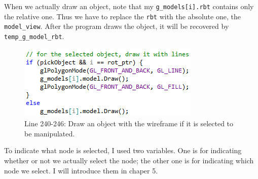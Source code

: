 \documentclass[11pt]{article}
\begin{document}
When we actually draw an object, note that my \texttt{g\_models[i].rbt} contains only the relative one. Thus we have to replace the \texttt{rbt} with the absolute one, the \texttt{model\_view}. After the program draws the object, it will be recovered by \texttt{temp\_g\_model\_rbt}.
\begin{figure}[htb]
	\begin{center}
		\includegraphics[width=0.6\linewidth]{drawObjectLine.png}
	\end{center}
	\caption{Line 240-246: Draw an object with the wireframe if it is selected to be manipulated.}
\end{figure}

To indicate what node is selected, I used two variables. One is for indicating whether or not we actually select the node; the other one is for indicating which node we select. I will introduce them in chaper 5.
\end{document}
